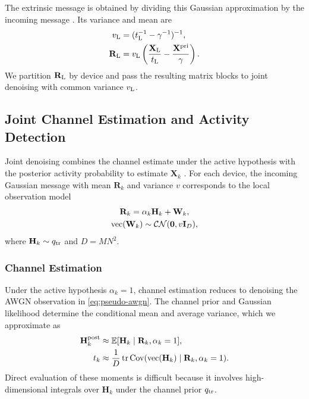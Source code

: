 The extrinsic message is obtained by dividing this Gaussian approximation
by the incoming message \cite{minka2001}.
Its variance and mean are
\begin{align}
 v_{\rm L}&=(t_{\rm L}^{-1}-\gamma^{-1})^{-1},
 \label{eq:linear-extrinsic}\\
 \mathbf R_{\rm L}&=v_{\rm L}
 \left(\frac{\mathbf X_{\rm L}}{t_{\rm L}}
       -\frac{\mathbf X^{\rm pri}}{\gamma}\right).
 \label{eq:linear-extrinsic-mean}
\end{align}
We partition $\mathbf R_{\rm L}$ by device and pass the resulting matrix blocks
to joint denoising with common variance $v_{\rm L}$.

\subsection{Joint Channel Estimation and Activity Detection}
\label{sec:joint-denoising}

Joint denoising combines the channel estimate under the active hypothesis
with the posterior activity probability to estimate $\mathbf X_k$
\cite[Sec.~III-B]{cai2026}.
For each device, the incoming Gaussian message with mean $\mathbf R_k$
and variance $v$ corresponds to the local observation model
\begin{equation}
 \begin{gathered}
 \mathbf R_k=\alpha_k \mathbf H_k+\mathbf W_k,\\
 \operatorname{vec}(\mathbf W_k)\sim\mathcal{CN}(\mathbf0,v\mathbf{I}_D),
 \end{gathered}
 \label{eq:pseudo-awgn}
\end{equation}
where $\mathbf H_k\sim q_{\rm tr}$ and $D=MN^2$.

\subsubsection{Channel Estimation}
\label{sec:channel-estimation}

Under the active hypothesis $\alpha_k=1$, channel estimation reduces to
denoising the AWGN observation in \eqref{eq:pseudo-awgn}.
The channel prior and Gaussian likelihood determine the conditional mean
and average variance, which we approximate as
\begin{align}
 \mathbf H_k^{\rm post}&\approx
 \mathbb{E}[\mathbf H_k\mid\mathbf R_k,\alpha_k=1],
 \label{eq:conditional-channel-integrals}\\
 t_k&\approx\frac1D\operatorname{tr}\operatorname{Cov}
 (\operatorname{vec}(\mathbf H_k)\mid\mathbf R_k,\alpha_k=1).
 \label{eq:conditional-channel-variance}
\end{align}
Direct evaluation of these moments is difficult because it involves
high-dimensional integrals over $\mathbf H_k$ under the channel prior
$q_{\rm tr}$.

